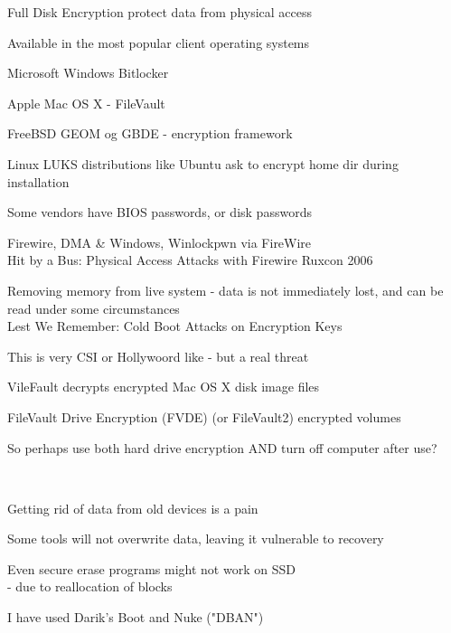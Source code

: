 \documentclass[Screen16to9,17pt]{foils}
\begin{document}

\begin{list1}
\item Full Disk Encryption protect data from physical access
\item Available in the most popular client operating systems
\begin{list2}
\item Microsoft Windows Bitlocker
\item Apple Mac OS X - FileVault
\item FreeBSD GEOM og GBDE - encryption framework
\item Linux LUKS distributions like Ubuntu ask to encrypt home dir during installation
\item Some vendors have BIOS passwords, or disk passwords
\end{list2}
\end{list1}


\begin{list2}
\item Firewire, DMA \& Windows, Winlockpwn via FireWire\\
Hit by a Bus: Physical Access Attacks with Firewire Ruxcon 2006
\item Removing memory from live system - data is not immediately lost, and can be read under some circumstances\\
Lest We Remember: Cold Boot Attacks on Encryption Keys\\
\item This is very CSI or Hollywoord like - but a real threat
\item VileFault decrypts encrypted Mac OS X disk image files\\ 
\item  FileVault Drive Encryption (FVDE) (or FileVault2) encrypted volumes\\
\end{list2}

\centerline{So perhaps use both hard drive encryption AND turn off computer after use?}


{~}

\begin{list1}
\item Getting rid of data from old devices is a pain
\item Some tools will not overwrite data, leaving it vulnerable to recovery
\item Even secure erase programs might not work on SSD\\
 - due to reallocation of blocks
\item I have used Darik's Boot and Nuke ("DBAN")\\
\end{list1}
\end{document}
